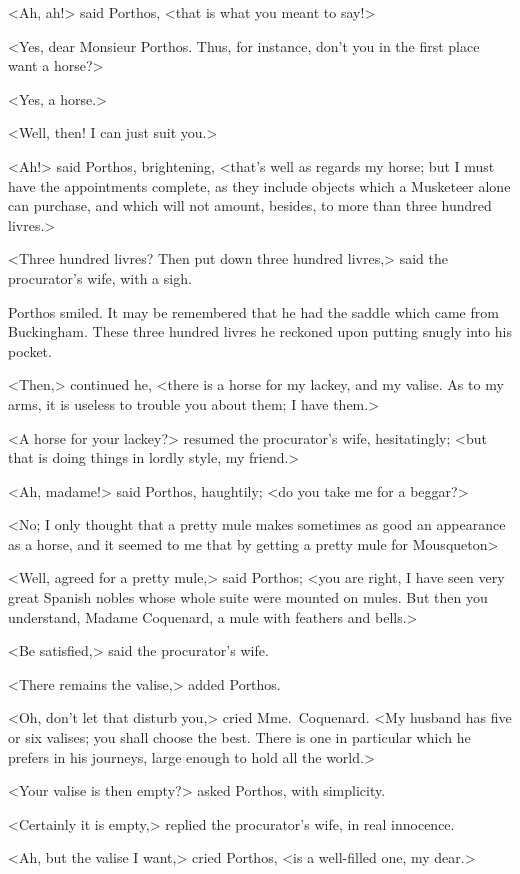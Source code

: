 <Ah, ah!> said Porthos, <that is what you meant to say!> 

<Yes, dear Monsieur Porthos. Thus, for instance, don't you in the first place want a horse?> 

<Yes, a horse.> 

<Well, then! I can just suit you.> 

<Ah!> said Porthos, brightening, <that's well as regards my horse; but I must have the appointments complete, as they include objects which a Musketeer alone can purchase, and which will not amount, besides, to more than three hundred livres.> 

<Three hundred livres? Then put down three hundred livres,> said the procurator's wife, with a sigh. 

Porthos smiled. It may be remembered that he had the saddle which came from Buckingham. These three hundred livres he reckoned upon putting snugly into his pocket. 

<Then,> continued he, <there is a horse for my lackey, and my valise. As to my arms, it is useless to trouble you about them; I have them.> 

<A horse for your lackey?> resumed the procurator's wife, hesitatingly; <but that is doing things in lordly style, my friend.> 

<Ah, madame!> said Porthos, haughtily; <do you take me for a beggar?> 

<No; I only thought that a pretty mule makes sometimes as good an appearance as a horse, and it seemed to me that by getting a pretty mule for Mousqueton\longdash> 

<Well, agreed for a pretty mule,> said Porthos; <you are right, I have seen very great Spanish nobles whose whole suite were mounted on mules. But then you understand, Madame Coquenard, a mule with feathers and bells.> 

<Be satisfied,> said the procurator's wife. 

<There remains the valise,> added Porthos. 

<Oh, don't let that disturb you,> cried Mme.~Coquenard. <My husband has five or six valises; you shall choose the best. There is one in particular which he prefers in his journeys, large enough to hold all the world.> 

<Your valise is then empty?> asked Porthos, with simplicity. 

<Certainly it is empty,> replied the procurator's wife, in real innocence. 

<Ah, but the valise I want,> cried Porthos, <is a well-filled one, my dear.> 

